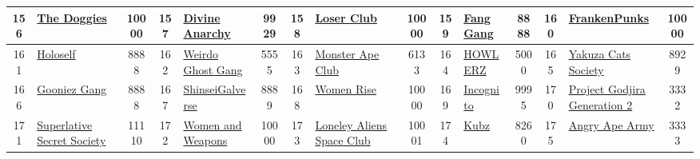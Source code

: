 \begin{table*}[]
{\begin{tabular}{|c|l|c|c|l|c|c|l|c|c|l|c|c|l|c|}
        156   & \href{https://www.sandbox.game/en/snoopdogg/}{The Doggies}                         & 10000             & 157   & \href{http://divineanarchy.com/}{Divine Anarchy}                                                  & 9929              & 158   & \href{https://loserclub.io/}{Loser Club}                                          & 10000             & 159   & \href{https://fanggang.io/}{Fang Gang}                                        & 8888              & 160   & \href{http://www.3dFrankenPunks.com}{FrankenPunks}                                        & 10000                                   \\ \hline
        161   & \href{http://momoguro.com}{Holoself}                                               & 8888              & 162   & \href{https://www.weirdoghost.com/}{Weirdo Ghost Gang}                                            & 5555              & 163   & \href{https://monsterapeclub.com/}{Monster Ape Club}                              & 6133              & 164   & \href{http://howlerz.io}{HOWLERZ}                                             & 5000              & 165   & \href{https://ycsdao.com}{Yakuza Cats Society}                                            & 8929                                    \\ \hline
        166   & \href{https://gooniezgang.com/}{Gooniez Gang}                                      & 8888              & 167   & \href{https://www.galverse.art/}{ShinseiGalverse}                                                 & 8889              & 168   & \href{https://www.womenrise.art/}{Women Rise}                                     & 10000             & 169   & \href{https://incognitonft.com/}{Incognito}                                   & 9995              & 170   & \href{https://pg-group.io/}{Project Godjira Generation 2}                                 & 3332                                    \\ \hline
        171   & \href{https://superlativesecretsociety.io}{Superlative Secret Society}             & 11110             & 172   & \href{http://www.womenandweapons.io}{Women and Weapons}                                           & 10000             & 173   & \href{http://lonelyaliens.com}{Loneley Aliens Space Club}                         & 10001             & 174   & \href{http://keungz.com}{Kubz}                                                & 8260              & 175   & \href{https://www.angryapearmy.com/}{Angry Ape Army}                                      & 3333                                    \\ \hline

\end{tabular}}
\end{table*}

